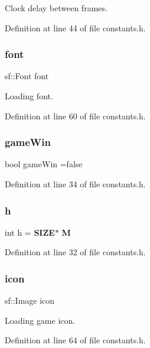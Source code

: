 Clock delay between frames. 



Definition at line 44 of file constants.\+h.

\mbox{\label{constants_8h_a6d354835cad461f09999bfceea320fc5}} 
\subsubsection{font}
{\footnotesize\ttfamily sf\+::\+Font font}



Loading font. 



Definition at line 60 of file constants.\+h.

\mbox{\label{constants_8h_ac8ee1501d37cb1b4ac45af679605dc2e}} 
\subsubsection{gameWin}
{\footnotesize\ttfamily bool game\+Win =false}



Definition at line 34 of file constants.\+h.

\mbox{\label{constants_8h_a16611451551e3d15916bae723c3f59f7}} 
\subsubsection{h}
{\footnotesize\ttfamily int h = \textbf{ S\+I\+ZE}$\ast$\textbf{ M}}



Definition at line 32 of file constants.\+h.

\mbox{\label{constants_8h_a91480013f141def3e514aff786b3e10c}} 
\subsubsection{icon}
{\footnotesize\ttfamily sf\+::\+Image icon}



Loading game icon. 



Definition at line 64 of file constants.\+h.

